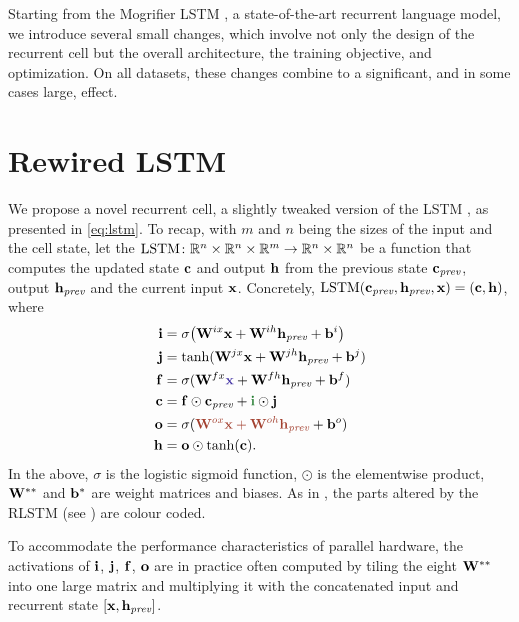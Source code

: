 Starting from the Mogrifier LSTM \citep{melis2019mogrifier}, a state-of-the-art recurrent language model, we introduce several small changes, which involve not only the design of the recurrent cell but the overall architecture, the training objective, and optimization.
On all datasets, these changes combine to a significant, and in some cases large, effect.


\section{Rewired LSTM}

We propose a novel recurrent cell, a slightly tweaked version of the LSTM \citep{hochreiter1997lstm}, as presented in \eqref{eq:lstm}.
To recap, with $m$ and $n$ being the sizes of the input and the cell state, let the $\operatorname*{LSTM} \colon \mathbb{R}^n\times\mathbb{R}^n \times \mathbb{R}^m \to \mathbb{R}^n \times \mathbb{R}^n$ be a function that computes the updated state $\mathbf{c}$ and output $\mathbf{h}$ from the previous state $\mathbf{c}_{\textit{prev}}$, output $\mathbf{h}_{\textit{prev}}$ and the current input $\mathbf{x}$.
Concretely, $\operatorname*{LSTM}(\mathbf{c}_{\textit{prev}}, \mathbf{h}_{\textit{prev}}, \mathbf{x}) = (\mathbf{c}, \mathbf{h})$, where
{\setlength{\jot}{0.5em}
\begin{align*}
  \vi &= \sigma\bigl(\mW^{ix} \vx + \mW^{ih} \vhprev + \vb^i\bigr)\\
  \vj &= \tanh(\mW^{jx}\vx + \mW^{jh} \vhprev + \vb^j) \\
  \vf &= \sigma(\mW^{fx} \textcolor{mglblue}{\vx} + \mW^{fh} \vhprev + \vb^f) \\
  \vc &= \vf \odot \vcprev + \textcolor{mglgreen}{\vi} \odot \vj \\
  \vo &= \sigma(\textcolor{mglred}{\mW^{ox} \vx + \mW^{oh} \vhprev} + \vb^o) \\
  \vh &= \vo \odot \tanh(\vc).
\end{align*}}%
In the above, $\sigma$ is the logistic sigmoid function, $\odot$ is the elementwise product, $\mathbf{W}^{**}$ and $\mathbf{b}^{*}$ are weight matrices and biases.
As in , the parts altered by the RLSTM (see ) are colour coded.

To accommodate the performance characteristics of parallel hardware, the activations of $\mathbf{i}$, $\mathbf{j}$, $\mathbf{f}$, $\mathbf{o}$ are in practice often computed by tiling the eight $\mathbf{W}^{**}$ into one large matrix and multiplying it with the concatenated input and recurrent state $[\mathbf{x}, \mathbf{h}_{\textit{prev}}]$.

